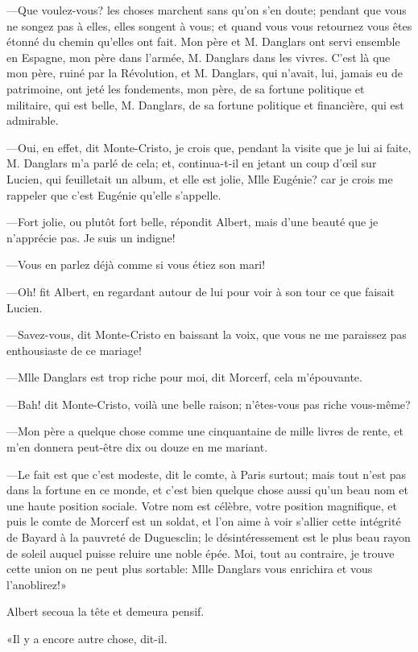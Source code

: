 —Que voulez-vous? les choses marchent sans qu'on s'en doute; pendant que vous ne songez pas à elles, elles songent à vous; et quand vous vous retournez vous êtes étonné du chemin qu'elles ont fait. Mon père et M. Danglars ont servi ensemble en Espagne, mon père dans l'armée, M. Danglars dans les vivres. C'est là que mon père, ruiné par la Révolution, et M. Danglars, qui n'avait, lui, jamais eu de patrimoine, ont jeté les fondements, mon père, de sa fortune politique et militaire, qui est belle, M. Danglars, de sa fortune politique et financière, qui est admirable. 

—Oui, en effet, dit Monte-Cristo, je crois que, pendant la visite que je lui ai faite, M. Danglars m'a parlé de cela; et, continua-t-il en jetant un coup d'œil sur Lucien, qui feuilletait un album, et elle est jolie, Mlle Eugénie? car je crois me rappeler que c'est Eugénie qu'elle s'appelle.  

—Fort jolie, ou plutôt fort belle, répondit Albert, mais d'une beauté que je n'apprécie pas. Je suis un indigne! 

—Vous en parlez déjà comme si vous étiez son mari! 

—Oh! fit Albert, en regardant autour de lui pour voir à son tour ce que faisait Lucien. 

—Savez-vous, dit Monte-Cristo en baissant la voix, que vous ne me paraissez pas enthousiaste de ce mariage! 

—Mlle Danglars est trop riche pour moi, dit Morcerf, cela m'épouvante. 

—Bah! dit Monte-Cristo, voilà une belle raison; n'êtes-vous pas riche vous-même? 

—Mon père a quelque chose comme une cinquantaine de mille livres de rente, et m'en donnera peut-être dix ou douze en me mariant. 

—Le fait est que c'est modeste, dit le comte, à Paris surtout; mais tout n'est pas dans la fortune en ce monde, et c'est bien quelque chose aussi qu'un beau nom et une haute position sociale. Votre nom est célèbre, votre position magnifique, et puis le comte de Morcerf est un soldat, et l'on aime à voir s'allier cette intégrité de Bayard à la pauvreté de Duguesclin; le désintéressement est le plus beau rayon de soleil auquel puisse reluire une noble épée. Moi, tout au contraire, je trouve cette union on ne peut plus sortable: Mlle Danglars vous enrichira et vous l'anoblirez!» 

Albert secoua la tête et demeura pensif. 

«Il y a encore autre chose, dit-il. 


